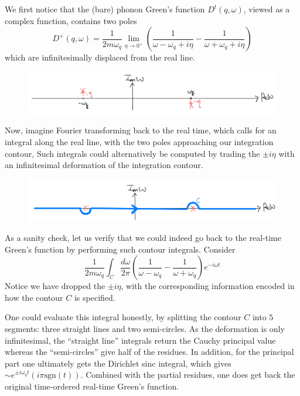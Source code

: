 We first notice that the (bare) phonon Green's function $D^t(q,\omega)$, viewed as a complex function, contains two poles
\[ D^+\left( q,\omega \right) =\frac{1}{2m\omega _q}\lim_{\eta \rightarrow 0^+} \left( \frac{1}{\omega -\omega _q+i\eta}-\frac{1}{\omega +\omega _q+i\eta} \right) \]
which are infinitesimally displaced from the real line.

\begin{figure}[ht]
    \centering
    \includegraphics[width=\textwidth]{jupyterbook/data/fig/lec12-fig00.png}
\end{figure}

Now, imagine Fourier transforming back to the real time, which calls for an integral along the real line, with the two poles approaching our integration contour, Such integrals could alternatively be computed by trading the $\pm i\eta$ with an infinitesimal deformation of the integration contour.
\begin{figure}[ht]
    \centering
    \includegraphics[width=\textwidth]{jupyterbook/data/fig/lec12-fig01.png}
\end{figure}
As a sanity check, let us verify that we could indeed go back to the real-time Green's function by performing such contour integrals. Consider
\[ \frac{1}{2m\omega _q}\int_C{\frac{d\omega}{2\pi}\left( \frac{1}{\omega -\omega _q}-\frac{1}{\omega +\omega _q} \right)}e^{-i\omega t}\]
Notice we have dropped the $\pm i\eta$, with the corresponding information encoded in how the contour $C$ is specified.

One could evaluate this integral honestly, by splitting the contour $C$ into $5$ segments: three straight lines and two semi-circles. As the deformation is only infinitesimal, the ``straight line'' integrals return  the Cauchy principal value whereas the ``semi-circles'' give half of the residues. In addition, for the principal part one ultimately gets the Dirichlet sinc integral, which gives $\sim e^{\pm i\omega_q t}(i\pi \mathrm{sgn}(t))$. Combined with the partial residues, one does get back the original time-ordered real-time Green's function.

